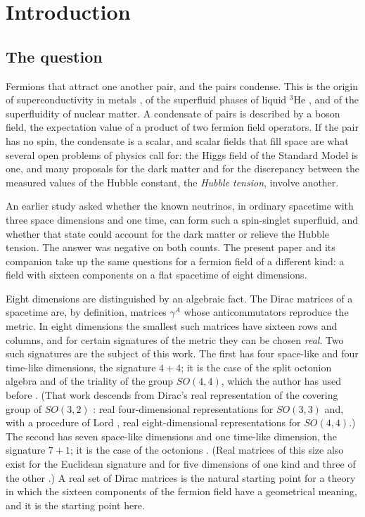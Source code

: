 
\section{Introduction}
\label{sec:intro}

\subsection{The question}

Fermions that attract one another pair, and the pairs condense. This is the origin of superconductivity
in metals \cite{BCS1957}, of the superfluid phases of liquid $^3$He \cite{Leggett1975}, and of the
superfluidity of nuclear matter. A condensate of pairs is described by a boson field, the expectation
value of a product of two fermion field operators. If the pair has no spin, the condensate is a scalar,
and scalar fields that fill space are what several open problems of physics call for: the Higgs field
of the Standard Model is one, and many proposals for the dark matter and for the discrepancy between
the measured values of the Hubble constant, the \emph{Hubble tension}, involve another.

An earlier study \cite{NashNCSS} asked whether the known neutrinos, in ordinary spacetime with three
space dimensions and one time, can form such a spin-singlet superfluid, and whether that state could
account for the dark matter or relieve the Hubble tension. The answer was negative on both counts. The
present paper and its companion  take up the same
questions for a fermion field of a different kind: a field with sixteen components on a flat spacetime
of eight dimensions.

Eight dimensions are distinguished by an algebraic fact. The Dirac matrices of a spacetime are, by
definition, matrices $\gamma^A$ whose anticommutators reproduce the metric. In eight dimensions the
smallest such matrices have sixteen rows and columns, and for certain signatures of the metric they
can be chosen \emph{real}. Two such signatures are the subject of this work. The first has four
space-like and four time-like dimensions, the signature $4+4$; it is the case of the split octonion
algebra and of the triality of the group $SO(4,4)$, which the author has used before
\cite{Nash1990,Nash2010}. (That work descends from Dirac's real representation of the covering group
of $SO(3,2)$ \cite{Dirac1963}: real four-dimensional representations for $SO(3,3)$
\cite{Nash1984,Nash1985} and, with a procedure of Lord \cite{Lord1968}, real eight-dimensional
representations for $SO(4,4)$.) The second has seven space-like dimensions and one time-like dimension,
the signature $7+1$; it is the case of the octonions
\cite{Bryant1982,HarveyLawson1982,BrownGray1967}. (Real matrices of this size also exist for the
Euclidean signature and for five dimensions of one kind and three of the other
\cite{AtiyahBottShapiro1964,LawsonMichelsohn1989}.) A real set of Dirac matrices is the natural starting
point for a theory in which the sixteen components of the fermion field have a geometrical meaning,
and it is the starting point here.

